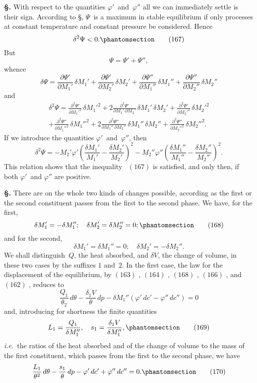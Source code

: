 \documentclass[12pt]{book}[2005/09/16]
\newcommand{\Section}[1]{
  \medskip\par\textbf{§\;#1}
  \label{section:#1}
}
\newcommand{\SecRef}[2][§\;]{\hyperref[section:#2.]{{\upshape #1#2}}}
\newcommand{\Tag}[1]{%
  \phantomsection\label{eqn:#1}\tag*{\ensuremath{#1}}%
}
\newcommand{\Eq}[1]{%
  \hyperref[eqn:#1]{\ensuremath{#1}}%
}
\newcommand{\PageSep}[1]{\ignorespaces}
\newcommand{\ie}{\emph{i.e.}}
\newcommand{\dd}{\partial}
\begin{document}
\Section{217.} With respect to the quantities $\varphi'$~and~$\varphi''$ all we
can immediately settle is their sign. According to \SecRef{147}, $\Psi$~is
a maximum in stable equilibrium if only processes at
constant temperature and constant pressure be considered.
Hence
\[
\delta^{2} \Psi < 0.
\Tag{(167)}
\]
But
\[
\Psi = \Psi' + \Psi'',
\]
whence
\[
\delta \Psi
  = \frac{\dd \Psi'}{\dd M_{1}'}\, \delta M_{1}' + \frac{\dd \Psi'}{\dd M_{2}'}\, \delta M_{2}'
  + \frac{\dd \Psi''}{\dd M_{1}''}\, \delta M_{1}'' + \frac{\dd \Psi''}{\dd M_{2}''}\, \delta M_{2}''
\]
and
\begin{multline*}
\delta^{2} \Psi
  = \frac{\dd^{2} \Psi'}{\dd M_{1}'^{2}}\, \delta M_{1}'^{2}
  + 2 \frac{\dd^{2} \Psi'}{\dd M_{1}'\, \dd M_{2}'}\, \delta M_{1}'\, \delta M_{2}'
  + \frac{\dd^{2} \Psi'}{\dd M_{2}'^{2}}\, \delta M_{2}'^{2} \\
  + \frac{\dd^{2} \Psi''}{\dd M_{1}''^{2}}\, \delta M_{1}''^{2}
  + 2 \frac{\dd^{2} \Psi''}{\dd M_{1}''\, \dd M_{2}''}\, \delta M_{1}''\, \delta M_{2}''
  + \frac{\dd^{2} \Psi''}{\dd M_{2}''^{2}}\, \delta M_{2}''^{2}.
\end{multline*}
\PageSep{194}
If we introduce the quantities $\varphi'$~and~$\varphi''$, then
\[
\delta^{2} \Psi
  = -M_{2}' \varphi' \left(\frac{\delta M_{1}'}{M_{1}'} - \frac{\delta M_{2}'}{M_{2}'}\right)^{2}
    -M_{2}'' \varphi'' \left(\frac{\delta M_{1}''}{M_{1}''} - \frac{\delta M_{2}''}{M_{2}''}\right)^{2}.
\]
This relation shows that the inequality~\Eq{(167)} is satisfied,
and only then, if both $\varphi'$~and $\varphi''$ are positive.

\Section{218.} There are on the whole two kinds of changes
possible, according as the first or the second constituent
passes from the first to the second phase. We have, for the
first,
\[
\delta M_{1}' = -\delta M_{1}'';\quad
\delta M_{2}' = \delta M_{2}'' = 0;
\Tag{(168)}
\]
and for the second,
\[
\delta M_{1}' = \delta M_{1}'' = 0;\quad
\delta M_{2}' = -\delta M_{2}''.
\]
We shall distinguish~$Q$, the heat absorbed, and $\delta V$,
the change of volume, in these two cases by the suffixes $1$
and~$2$. In the first case, the law for the displacement of the
equilibrium, by \Eq{(163)}, \Eq{(164)}, \Eq{(168)}, \Eq{(166)}, and~\Eq{(162)}, reduces
to
\[
\frac{Q_{1}}{\theta_{2}}\, d\theta - \frac{\delta_{1}V}{\theta}\, dp
  - \delta M_{1}'' (\varphi'\, dc' - \varphi''\, dc'') = 0
\]
and, introducing for shortness the finite quantities
\[
L_{1} = \frac{Q_{1}}{\delta M_{1}''},\quad
s_{1} = \frac{\delta_{1}V}{\delta M_{1}''},
\Tag{(169)}
\]
\ie\ the ratios of the heat absorbed and of the change of
volume to the mass of the first constituent, which passes
from the first to the second phase, we have
\[
\frac{L_{1}}{\theta^{2}}\, d\theta - \frac{s_{1}}{\theta}\, dp - \varphi'\, dc' + \varphi''\, dc'' = 0.
\Tag{(170)}
\]
\PageSep{195}
\end{document}
